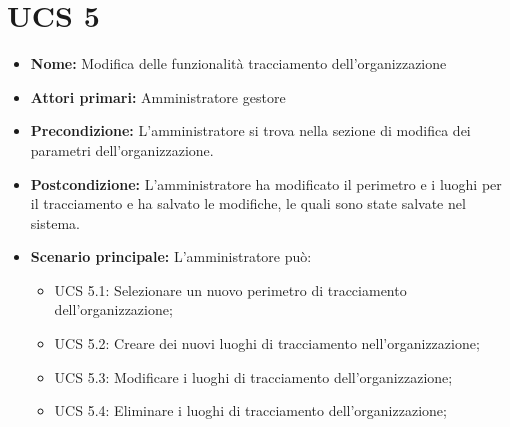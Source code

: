 \section{UCS 5}%
\begin{itemize}
    \item \textbf{Nome:} Modifica delle funzionalità tracciamento dell'organizzazione
    \item \textbf{Attori primari:} Amministratore gestore
    \item \textbf{Precondizione:} L'amministratore si trova nella sezione di modifica dei parametri dell'organizzazione.
    \item \textbf{Postcondizione:} L'amministratore ha modificato il perimetro e i luoghi per il tracciamento e ha salvato le modifiche, le quali sono state salvate nel sistema.
    \item \textbf{Scenario principale:} L'amministratore può:
    \begin{itemize}
        \item UCS 5.1: Selezionare un nuovo perimetro di tracciamento dell'organizzazione;
        \item UCS 5.2: Creare dei nuovi luoghi di tracciamento nell'organizzazione;
        \item UCS 5.3: Modificare i luoghi di tracciamento dell'organizzazione;
        \item UCS 5.4: Eliminare i luoghi di tracciamento dell'organizzazione;
    \end{itemize}
    
     
\end{itemize}


